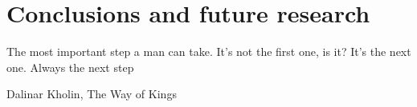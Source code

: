 \documentclass[11pt,a4paper,twoside]{book}
\begin{document}
\chapter{Conclusions and future research}
\begin{FraseCelebre}
    \begin{Frase}
        The most important step a man can take. It's not the first one, is it? It's the next one. Always the next step
    \end{Frase}
    \begin{Fuente}
        Dalinar Kholin, The Way of Kings
    \end{Fuente}
\end{FraseCelebre}
\label{chapter:conclusions}


% 

\backmatter

%
%



\end{document}
